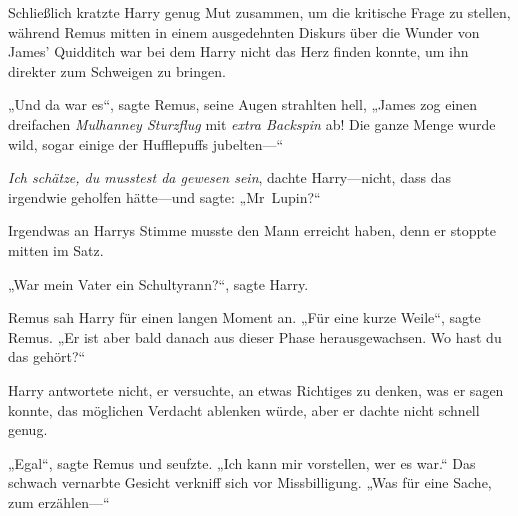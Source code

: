 Schließlich kratzte Harry genug Mut zusammen, um die kritische Frage zu stellen, während Remus mitten in einem ausgedehnten Diskurs über die Wunder von James' Quidditch war bei dem Harry nicht das Herz finden konnte, um ihn direkter zum Schweigen zu bringen.

„Und da war es“, sagte Remus, seine Augen strahlten hell, „James zog einen dreifachen \emph{Mulhanney Sturzflug} mit \emph{extra Backspin} ab! Die ganze Menge wurde wild, sogar einige der Hufflepuffs jubelten—“

\emph{Ich schätze, du musstest da gewesen sein}, dachte Harry—nicht, dass das irgendwie geholfen hätte—und sagte: „Mr~Lupin?“

Irgendwas an Harrys Stimme musste den Mann erreicht haben, denn er stoppte mitten im Satz.

„War mein Vater ein Schultyrann?“, sagte Harry.

Remus sah Harry für einen langen Moment an. „Für eine kurze Weile“, sagte Remus. „Er ist aber bald danach aus dieser Phase herausgewachsen. Wo hast du das gehört?“

Harry antwortete nicht, er versuchte, an etwas Richtiges zu denken, was er sagen konnte, das möglichen Verdacht ablenken würde, aber er dachte nicht schnell genug.

„Egal“, sagte Remus und seufzte. „Ich kann mir vorstellen, wer es war.“ Das schwach vernarbte Gesicht verkniff sich vor Missbilligung. „Was für eine Sache, zum erzählen—“

